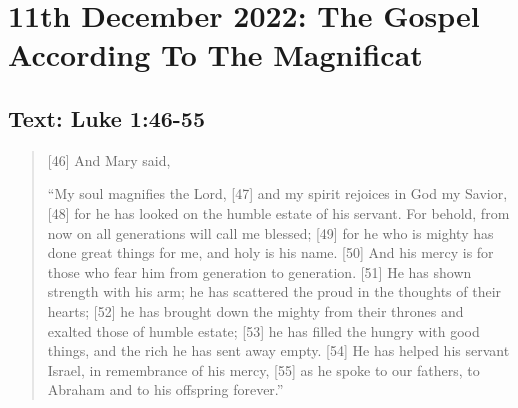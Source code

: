 \section{11th December 2022: The Gospel According To The Magnificat}
\subsection*{Text: Luke 1:46-55}
  \begin{quote}
    [46] And Mary said,

    “My soul magnifies the Lord,
    [47]     and my spirit rejoices in God my Savior,
    [48] for he has looked on the humble estate of his servant.
        For behold, from now on all generations will call me blessed;
    [49] for he who is mighty has done great things for me,
        and holy is his name.
    [50] And his mercy is for those who fear him
        from generation to generation.
    [51] He has shown strength with his arm;
        he has scattered the proud in the thoughts of their hearts;
    [52] he has brought down the mighty from their thrones
        and exalted those of humble estate;
    [53] he has filled the hungry with good things,
        and the rich he has sent away empty.
    [54] He has helped his servant Israel,
        in remembrance of his mercy,
    [55] as he spoke to our fathers,
        to Abraham and to his offspring forever.”
  \end{quote}
